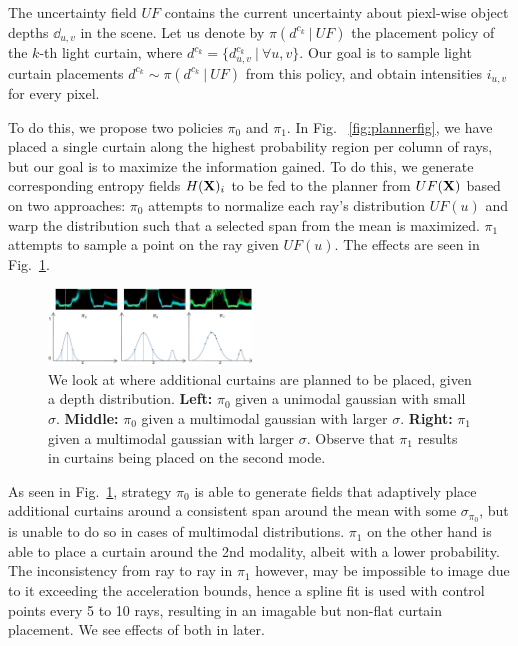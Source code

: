 The uncertainty field $UF$ contains the current uncertainty about piexl-wise object depths $\dd_{u, v}$ in the scene. Let us denote by $\pi(d^{c_k}\ |\ UF)$ the placement policy of the $k$-th light curtain, where $d^{c_k} = \{d^{c_k}_{u, v}\ |\ \forall u, v\}$. Our goal is to sample light curtain placements $d^{c_k} \sim \pi(d^{c_k}\ |\ UF)$ from this policy, and obtain intensities $i_{u, v}$ for every pixel.

To do this, we propose two policies $\pi_{0}$ and $\pi_{1}$. In Fig. ~\ref{fig:plannerfig}, we have placed a single curtain along the highest probability region per column of rays, but our goal is to maximize the information gained. To do this, we generate corresponding entropy fields $H(\mathbf{X})_{i}$ to be fed to the planner from $UF(\mathbf{X})$ based on two approaches: $\pi_{0}$ attempts to normalize each ray's distribution $UF(u)$ and warp the distribution such that a selected span from the mean is maximized. $\pi_{1}$ attempts to sample a point on the ray given $UF(u)$. The effects are seen in Fig.~\ref{fig:m0m1}.

\begin{figure}[h]
   \centering
       \centering
       \includegraphics[width=0.48\textwidth]{figures/fields.pdf}
   \centering
   \caption{We look at where additional curtains are planned to be placed, given a depth distribution. \textbf{Left:} $\pi_{0}$ given a unimodal gaussian with small $\sigma$. \textbf{Middle:} $\pi_{0}$ given a multimodal gaussian with larger $\sigma$. \textbf{Right:} $\pi_{1}$ given a multimodal gaussian with larger $\sigma$. Observe that $\pi_{1}$ results in curtains being placed on the second mode.} 
   \label{fig:m0m1} 
\end{figure}

As seen in Fig.~\ref{fig:m0m1}, strategy $\pi_{0}$ is able to generate fields that adaptively place additional curtains around a consistent span around the mean with some $\sigma_{\pi_{0}}$, but is unable to do so in cases of multimodal distributions. $\pi_{1}$ on the other hand is able to place a curtain around the 2nd modality, albeit with a lower probability. The inconsistency from ray to ray in $\pi_{1}$ however, may be impossible to image due to it exceeding the acceleration bounds, hence a spline fit is used with control points every 5 to 10 rays, resulting in an imagable but non-flat curtain placement. We see effects of both in later.

